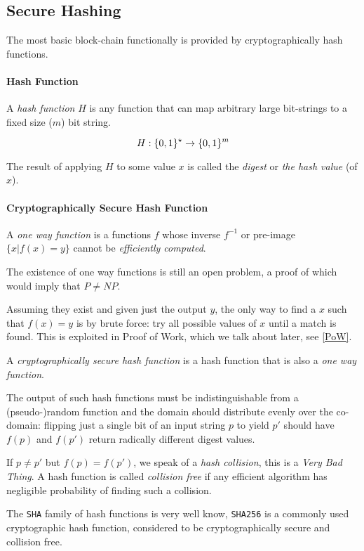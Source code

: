 \subsection{Secure Hashing}

The most basic block-chain functionally is provided by cryptographically hash functions.

\paragraph{Hash Function}

A \emph{hash function} $H$ is any function that can map arbitrary large bit-strings to a fixed size ($m$) bit string.

\[
	H :   \{0,1\} ^{\star}  \to   \{0,1\} ^{m} 
\]

The result of applying $H$ to some value $x$ is called the \emph{digest} or \emph{the hash value} (of $x$).

\paragraph{Cryptographically Secure Hash Function}

A \emph{one way function} is a functions $f$ whose inverse $f^{-1}$ or pre-image $\{x | f(x) = y \}$ cannot be \emph{efficiently computed}.

The existence of one way functions is still an open problem, a proof of which would imply that $P \neq NP$.

Assuming they exist and given just the output $y$, the only way to find a $x$ 
such that $f(x)=y$ is by brute force: try all possible values of $x$ until a
match is found. This is exploited in Proof of Work, which we talk about
later, see \ref{PoW}.

A \emph{cryptographically secure hash function} is a hash function that is also a \emph{one way function}.

The output of such hash functions must be indistinguishable from a (pseudo-)random function and the domain should distribute evenly over the co-domain: flipping just a single bit of an input string $p$ to yield $p'$ should have $f(p)$ and $f(p')$ return radically different digest values.

If $p \neq p'$ but $f(p) = f(p')$, we speak of a \emph{hash collision}, this is a \emph{Very Bad Thing}. A hash function is called \emph{collision free} if any efficient algorithm has negligible probability of finding such a collision.

The \texttt{SHA} family of hash functions is very well know, \texttt{SHA256} is a commonly used cryptographic hash function, considered to be cryptographically secure and collision free. 
